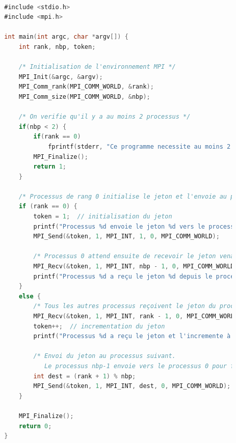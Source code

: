\documentclass[a4paper,13pt]{book}
\begin{document}
	\begin{lstlisting}[language=C]

        #include <stdio.h>
        #include <mpi.h>
        
        int main(int argc, char *argv[]) {
            int rank, nbp, token;
        
            /* Initialisation de l'environnement MPI */
            MPI_Init(&argc, &argv);
            MPI_Comm_rank(MPI_COMM_WORLD, &rank);
            MPI_Comm_size(MPI_COMM_WORLD, &nbp);
        
            /* On verifie qu'il y a au moins 2 processus */
            if(nbp < 2) {
                if(rank == 0)
                    fprintf(stderr, "Ce programme necessite au moins 2 processus.\n");
                MPI_Finalize();
                return 1;
            }
        
            /* Processus de rang 0 initialise le jeton et l'envoie au processus de rang 1 */
            if (rank == 0) {
                token = 1;  // initialisation du jeton
                printf("Processus %d envoie le jeton %d vers le processus 1\n", rank, token);
                MPI_Send(&token, 1, MPI_INT, 1, 0, MPI_COMM_WORLD);
                
                /* Processus 0 attend ensuite de recevoir le jeton venant du dernier processus */
                MPI_Recv(&token, 1, MPI_INT, nbp - 1, 0, MPI_COMM_WORLD, MPI_STATUS_IGNORE);
                printf("Processus %d a reçu le jeton %d depuis le processus %d\n", rank, token, nbp - 1);
            }
            else {
                /* Tous les autres processus reçoivent le jeton du processus precedent */
                MPI_Recv(&token, 1, MPI_INT, rank - 1, 0, MPI_COMM_WORLD, MPI_STATUS_IGNORE);
                token++;  // incrementation du jeton
                printf("Processus %d a reçu le jeton et l'incremente à %d\n", rank, token);
        
                /* Envoi du jeton au processus suivant.
                   Le processus nbp-1 envoie vers le processus 0 pour fermer l'anneau. */
                int dest = (rank + 1) % nbp;
                MPI_Send(&token, 1, MPI_INT, dest, 0, MPI_COMM_WORLD);
            }
        
            MPI_Finalize();
            return 0;
        }
        
\end{lstlisting}
\end{document}
